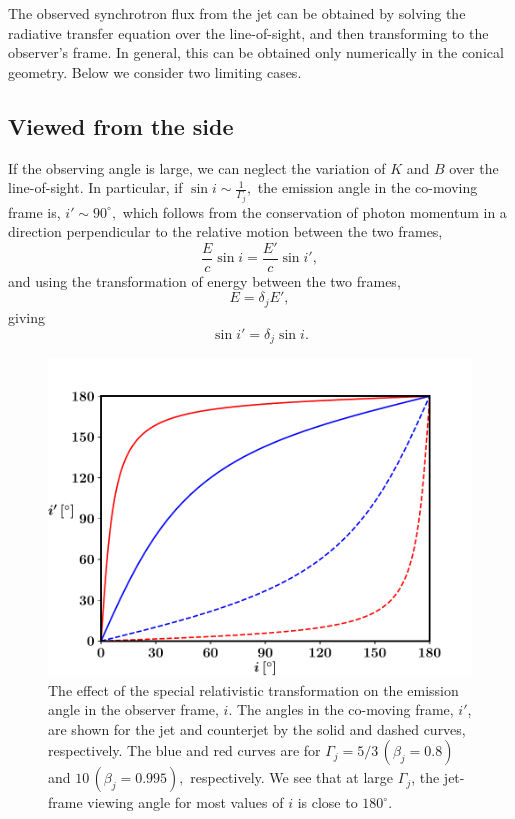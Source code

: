 The observed synchrotron flux from the jet can be obtained by solving the radiative transfer equation over the line-of-sight, and then transforming to the observer's frame. In general, this can be obtained only numerically in the conical geometry. Below we consider two limiting cases.


\subsection{Viewed from the side}


If the observing angle is large, we can neglect the variation of $ K $ and $ B $ over the line-of-sight. In particular, if $ \sin i \sim \frac{1}{\Gamma_j} , $ the emission angle in the co-moving frame is, $ i' \sim 90^{\circ} , $ which follows from the conservation of photon momentum in a direction perpendicular to the relative motion between the two frames,
\begin{equation}
\frac{E}{c} \sin i = \frac{E'}{c} \sin i',
\end{equation}
and using the transformation of energy between the two frames,
\begin{equation}
E = \delta_j E',
\end{equation}
giving
\begin{equation}
\sin i' = \delta_j \sin i.
\end{equation}


\begin{figure}
\noindent \centering{}\includegraphics[scale=0.40]{angle_transformation.pdf}\caption{{The effect of the special relativistic transformation on the emission angle in the observer frame, $ i $. The angles in the co-moving frame, $ i' $, are shown for the jet and counterjet by the solid and dashed curves, respectively. The blue and red curves are for $ \Gamma_j = 5/3 \, ( \beta_j = 0.8 ) $ and $ 10 \, ( \beta_j = 0.995 ) , $ respectively. We see that at large $ \Gamma_j $, the jet-frame viewing angle for most values of $ i $ is close to $ 180 ^ {\circ} $.}
\label{fig:The_angle_transformation}}
\end{figure}


